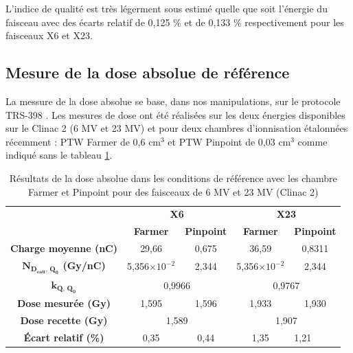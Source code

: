 \documentclass{article}
\begin{document}
L'indice de qualité est très légerment sous estimé quelle que soit l'énergie du faisceau avec des écarts relatif de 0,125 \% et de 0,133 \% respectivement pour les faisceaux X6 et X23.

\subsection{Mesure de la dose absolue de référence}

La messure de la dose absolue se base, dans nos manipulations, sur le protocole TRS-398 \cite{international2001iaea}. Les mesures de dose ont été réalisées sur les deux énergies disponibles sur le Clinac 2 (6 MV et 23 MV) et pour deux chambres d'ionnisation étalonnées récemment : PTW  Farmer de 0,6 cm$^3$ et PTW Pinpoint de 0,03 cm$^3$ comme indiqué sans le tableau \ref*{table_dose_abs_resultats}.

\begin{table}[h!]
  \centering
  \begin{tabular}{c|cc|cc|}
  \cline{2-5}
                                             & \multicolumn{2}{c|}{\textbf{X6}}    & \multicolumn{2}{c|}{\textbf{X23}}   \\ \cline{2-5} 
                                             & \textbf{Farmer} & \textbf{Pinpoint} & \textbf{Farmer} & \textbf{Pinpoint} \\ \hline
  \multicolumn{1}{|c|}{\textbf{Charge moyenne (nC)}} & 29,66           & 0,675             & 36,59           & 0,8311            \\
  \multicolumn{1}{|c|}{\textbf{$\mathbf{N_{D_{eau},\, Q_0}}$ (Gy/nC)}} & 5,356$\times 10^{-2}$ & 2,344 & 5,356$\times 10^{-2}$ & 2,344                     \\
  \multicolumn{1}{|c|}{\textbf{$\mathbf{k_{Q,\, Q_0}}$}}       & \multicolumn{2}{c|}{0,9966}   & \multicolumn{2}{c|}{0,9767}                       \\
  \multicolumn{1}{|c|}{\textbf{Dose mesurée (Gy)}}   & 1,595           & 1,596             & 1,933            & 1,930             \\
  \multicolumn{1}{|c|}{\textbf{Dose recette (Gy)}}             & \multicolumn{2}{c|}{1,589}    & \multicolumn{2}{c|}{1,907}                        \\
  \multicolumn{1}{|c|}{\textbf{Écart relatif (\%)}}            & 0,35                  & 0,44  & 1,35                  & \multicolumn{1}{l|}{1,21} \\ \hline
  \end{tabular}
  \caption{Résultats de la dose absolue dans les conditions de référence avec les chambre Farmer et Pinpoint pour des faisceaux de 6 MV et 23 MV (Clinac 2)}
  \label{table_dose_abs_resultats}
\end{table}
\end{document}
